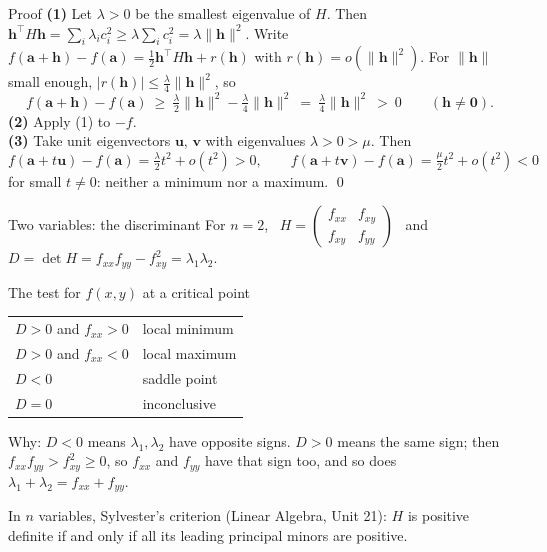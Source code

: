 \documentclass[10pt]{wosm-slides}
\newcommand{\norm}[1]{\lVert #1 \rVert}
\newcommand{\va}{\mathbf{a}}
\newcommand{\vh}{\mathbf{h}}
\newcommand{\vu}{\mathbf{u}}
\DeclareRobustCommand{\vv}{\mathbf{v}}
\begin{document}
\begin{frame}{Proof}
  \textbf{(1)} Let $\lambda > 0$ be the smallest eigenvalue of $H$. Then
  $\vh^\top H\vh = \sum_i \lambda_i c_i^2 \ge \lambda \sum_i c_i^2 = \lambda \norm{\vh}^2$.
  \pause
  Write $f(\va + \vh) - f(\va) = \frac12 \vh^\top H \vh + r(\vh)$ with $r(\vh) = o(\norm{\vh}^2)$.
  For $\norm{\vh}$ small enough, $|r(\vh)| \le \frac{\lambda}{4}\norm{\vh}^2$, so
  \[ f(\va + \vh) - f(\va) \ \ge\ \tfrac{\lambda}{2}\norm{\vh}^2 - \tfrac{\lambda}{4}\norm{\vh}^2
     \ =\ \tfrac{\lambda}{4}\norm{\vh}^2 \ >\ 0 \qquad (\vh \ne \mathbf 0) . \]
  \pause
  \textbf{(2)} Apply (1) to $-f$.
  \pause\\[0.4em]
  \textbf{(3)} Take unit eigenvectors $\vu$, $\vv$ with eigenvalues $\lambda > 0 > \mu$. Then
  \[ f(\va + t\vu) - f(\va) = \tfrac{\lambda}{2} t^2 + o(t^2) > 0, \qquad
     f(\va + t\vv) - f(\va) = \tfrac{\mu}{2} t^2 + o(t^2) < 0 \]
  for small $t \ne 0$: neither a minimum nor a maximum. \qed
\end{frame}

\begin{frame}{Two variables: the discriminant}
  For $n = 2$, \ $H = \begin{pmatrix} f_{xx} & f_{xy} \\ f_{xy} & f_{yy} \end{pmatrix}$ \ and \
  $D = \det H = f_{xx} f_{yy} - f_{xy}^2 = \lambda_1 \lambda_2$.
  \begin{block}{The test for $f(x, y)$ at a critical point}
    \begin{tabular}{@{}ll@{}}
      $D > 0$ and $f_{xx} > 0$ & local minimum \\
      $D > 0$ and $f_{xx} < 0$ & local maximum \\
      $D < 0$                  & saddle point \\
      $D = 0$                  & inconclusive
    \end{tabular}
  \end{block}
  \pause
  {\small Why: $D < 0$ means $\lambda_1, \lambda_2$ have opposite signs. $D > 0$ means the same sign;
  then $f_{xx} f_{yy} > f_{xy}^2 \ge 0$, so $f_{xx}$ and $f_{yy}$ have that sign too, and so does
  $\lambda_1 + \lambda_2 = f_{xx} + f_{yy}$.\par}
  \pause
  {\small In $n$ variables, Sylvester's criterion (Linear Algebra, Unit 21): $H$ is positive definite
  if and only if all its leading principal minors are positive.\par}
\end{frame}
\end{document}
